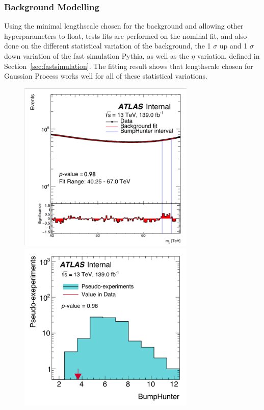 \subsubsection{Background Modelling}
Using the minimal lengthscale chosen for the background and allowing other hyperparameters to float, tests fits are performed on the nominal fit, and also done on the different statistical variation of the background, the 1 $\sigma$ up and 1 $\sigma$ down variation of the fast simulation Pythia, as well as the $\eta$ variation, defined in Section~\ref{sec:fastsimulation}.
The fitting result shows that lengthscale chosen for Gaussian Process works well for all of these statistical variations. 

\begin{figure}[!htb]
    \begin{center}
        \includegraphics[width=0.75\textwidth]{figures/chapter_dimuon/Nominal}        
        \includegraphics[width=0.75\textwidth]{figures/chapter_dimuon/NominalBH}        

\end{center}
\end{figure}
